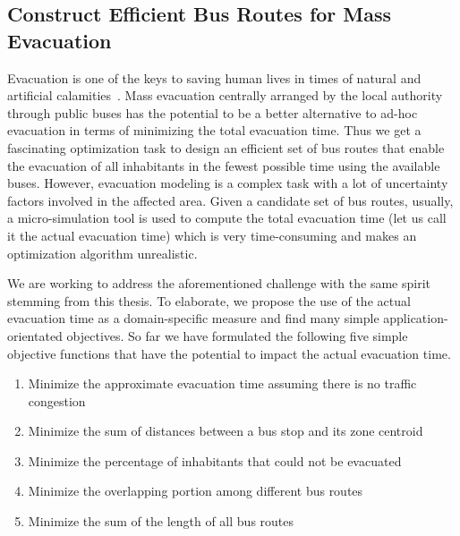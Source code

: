 \subsection{Construct Efficient Bus Routes for Mass Evacuation }
Evacuation is one of the keys to saving human lives in times of natural and artificial calamities~\cite{alam2019development, alam2021shelter, alam2021dynamic}. Mass evacuation centrally arranged by the local authority through public buses has the potential to be a better alternative to ad-hoc evacuation in terms of minimizing the total evacuation time. Thus we get a fascinating optimization task to design an efficient set of bus routes that enable the evacuation of all inhabitants in the fewest possible time using the available buses. However, evacuation modeling is a complex task with a lot of uncertainty factors involved in the affected area. Given a candidate set of bus routes, usually, a micro-simulation tool is used to compute the total evacuation time (let us call it the actual evacuation time) which is very time-consuming and makes an optimization algorithm unrealistic. 

We are working to address the aforementioned challenge with the same spirit stemming from this thesis. To elaborate, we propose the use of the actual evacuation time as a domain-specific measure and find many simple application-orientated objectives. So far we have formulated the following five simple objective functions that have the potential to impact the actual evacuation time.

\begin{enumerate}[label=$F_\arabic*$)]
	\item Minimize the approximate evacuation time assuming there is no traffic congestion
	\item Minimize the sum of distances between a bus stop and its zone centroid
	\item Minimize the percentage of inhabitants that could not be evacuated
	\item Minimize the overlapping portion among different bus routes
	\item Minimize the sum of the length of all bus routes
\end{enumerate}

